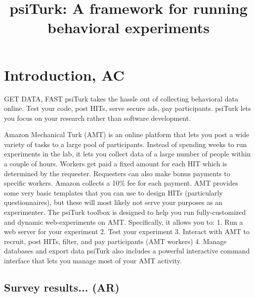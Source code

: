\documentclass[jou,apacite]{apa6}
\title{psiTurk: A framework for running behavioral experiments}
\begin{document}
\maketitle
\section{Introduction, AC}
GET DATA, FAST
psiTurk takes the hassle out of collecting behavioral data online.
Test your code, post HITs, serve secure ads, pay participants.
psiTurk lets you focus on your research rather than software development.

Amazon Mechanical Turk (AMT) is an online platform that lets you post a wide variety of tasks to a large pool of participants.
Instead of spending weeks to run experiments in the lab, it lets you collect data of a large number of people within a couple of hours.
Workers get paid a fixed amount for each HIT which is determined by the requester.
Requesters can also make bonus payments to specific workers. Amazon collects a 10\% fee for each payment.
AMT provides some very basic templates that you can use to design HITs (particularly questionnaires), but these will most likely not serve your purposes as an experimenter.
The psiTurk toolbox is designed to help you run fully-customized and dynamic web-experiments on AMT.
Specifically, it allows you to:
1. Run a web server for your experiment
2. Test your experiment
3. Interact with AMT to recruit, post HITs, filter, and pay participants (AMT workers)
4. Manage databases and export data
psiTurk also includes a powerful interactive command interface that lets you manage most of your AMT activity.

\subsection{Survey results... (AR)}
\end{document}
